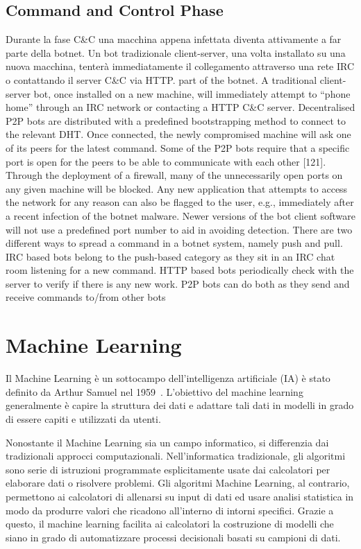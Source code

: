\subsection{Command and Control Phase}
Durante la fase C\&C una macchina appena infettata diventa attivamente a far parte della botnet. Un bot tradizionale client-server, una volta installato su una nuova macchina, tenterà immediatamente il collegamento attraverso una rete IRC o contattando il server C\&C via HTTP.
part of the botnet. A traditional client-server bot, once installed on a new
machine, will immediately attempt to “phone home” through an IRC network
or contacting a HTTP C&C server. Decentralised P2P bots are distributed
with a predefined bootstrapping method to connect to the relevant DHT.
Once connected, the newly compromised machine will ask one of its peers
for the latest command. Some of the P2P bots require that a specific port is
open for the peers to be able to communicate with each other [121]. Through
the deployment of a firewall, many of the unnecessarily open ports on any
given machine will be blocked. Any new application that attempts to access
the network for any reason can also be flagged to the user, e.g., immediately
after a recent infection of the botnet malware. Newer versions of the bot client
software will not use a predefined port number to aid in avoiding detection.
There are two different ways to spread a command in a botnet system, namely
push and pull. IRC based bots belong to the push-based category as they sit in
an IRC chat room listening for a new command. HTTP based bots periodically
check with the server to verify if there is any new work. P2P bots can do both
as they send and receive commands to/from other bots

\newpage
\section{Machine Learning}
\label{machinelearning}
Il Machine Learning è un sottocampo dell'intelligenza artificiale (IA) è stato definito da Arthur Samuel nel 1959~\cite{5392560}. L'obiettivo del machine learning generalmente è capire la struttura dei dati e adattare tali dati in modelli in grado di essere capiti e utilizzati da utenti.

Nonostante il Machine Learning sia un campo informatico, si differenzia dai tradizionali approcci computazionali. Nell'informatica tradizionale, gli algoritmi sono serie di istruzioni programmate esplicitamente usate dai calcolatori per elaborare dati o risolvere problemi. Gli algoritmi Machine Learning, al contrario, permettono ai calcolatori di allenarsi su input di dati ed usare analisi statistica in modo da produrre valori che ricadono all'interno di intorni specifici. Grazie a questo, il machine learning facilita ai calcolatori la costruzione di modelli che siano in grado di automatizzare processi decisionali basati su campioni di dati.

